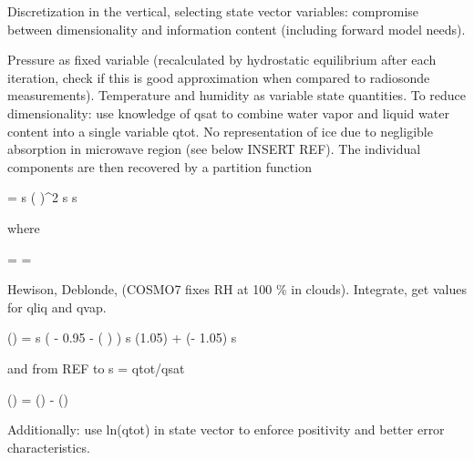 \stopsection


\startsection[title=Representation of the Atmospheric State]

    Discretization in the vertical, selecting state vector variables:
    compromise between dimensionality and information content (including
    forward model needs).

    \startsubsection[title=The Choice of State Vector Variables]

        Pressure as fixed variable (recalculated by hydrostatic equilibrium
        after each iteration, check if this is good approximation when compared
        to radiosonde measurements). Temperature and humidity as variable
        state quantities. To reduce dimensionality: use knowledge of qsat to
        combine water vapor and liquid water content into a single variable
        qtot. No representation of ice due to negligible absorption in
        microwave region (see below INSERT REF). The individual components are
        then recovered by a partition function

        \startformula
            \DERIV{\QLIQ}{\RHL} = \QSAT \startcases
                 \MC s  \NR
                \NC \cos \left(   \right)^2
                     \le s  \EQCOMMA\NR
                  \lt s \NR
            \stopcases
        \stopformula

        where

        \startformula
            \RHL = \frac{\QTOT}{\QSAT} = \frac{\QVAP + \QLIQ}{\QSAT} \EQSTOP
        \stopformula

        Hewison, Deblonde, (COSMO7 fixes RH at 100 \% in clouds). Integrate,
        get values for qliq and qvap.

        \startformula
            \QLIQ(\RHL) = \startcases
                 \MC s  \NR
                \NC {} \left( \RHL - 0.95 - 
                    \cos \left(  \right) \right)
                     \le s  \NR
                \NC \QLIQ(1.05) + \QSAT (\RHL - 1.05)  \lt s \NR
            \stopcases
        \stopformula

        and from REF to s = qtot/qsat

        \startformula
            \QVAP(\RHL) = \QTOT(\RHL) - \QLIQ(\RHL) \EQSTOP
        \stopformula

        Additionally: use ln(qtot) in state vector to enforce positivity and
        better error characteristics.

